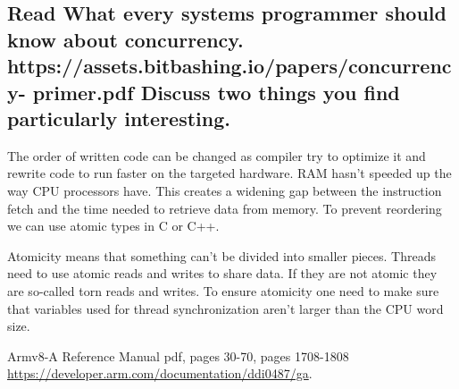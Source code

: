 \documentclass[runningheads]{llncs}
\begin{document}
\subsection{Read What every systems programmer should know about concurrency. https://assets.bitbashing.io/papers/concurrency- primer.pdf
Discuss two things you find particularly interesting.}
The order of written code can be changed as compiler try to optimize it and rewrite code to run faster on the targeted hardware.
RAM hasn’t speeded up the way CPU processors have. This creates a widening gap between the instruction fetch and the time needed to retrieve data from memory.
To prevent reordering we can use atomic types in C or C++.

Atomicity means that something can’t be divided into smaller pieces. Threads need to use atomic reads and writes to share data. 
If they are not atomic they are so-called torn reads and writes.
To ensure atomicity one need to make sure that variables used for thread synchronization aren’t larger than the CPU word size.
%
%
%
% 
% 
%
\begin{thebibliography}{8}

Armv8-A Reference Manual pdf, pages 30-70, pages 1708-1808 \\ \url{https://developer.arm.com/documentation/ddi0487/ga}.

\end{thebibliography}
\end{document}
